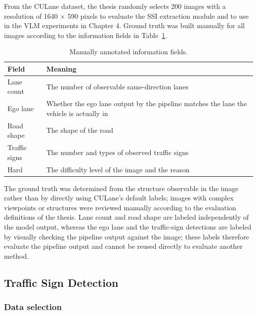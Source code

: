 \documentclass[12pt,a4paper]{report}
\begin{document}
From the CULane dataset, the thesis randomly selects 200 images with a resolution of 1640 $\times$ 590 pixels to evaluate the SSI extraction module and to use in the VLM experiments in Chapter 4. Ground truth was built manually for all images according to the information fields in Table~\ref{tab:3.3}.

\begin{table}[H]
    \centering
    \small
    \renewcommand{\arraystretch}{1.25}
    \caption{Manually annotated information fields.}
    \label{tab:3.3}
    \begin{tabularx}{\linewidth}{
        >{\RaggedRight\arraybackslash}p{3.0cm}
        >{\RaggedRight\arraybackslash}X
    }
        \toprule
        \textbf{Field} & \textbf{Meaning} \\
        \midrule
        Lane count & The number of observable same-direction lanes \\
        Ego lane & Whether the ego lane output by the pipeline matches the lane the vehicle is actually in \\
        Road shape & The shape of the road \\
        Traffic signs & The number and types of observed traffic signs \\
        Hard & The difficulty level of the image and the reason \\
        \bottomrule
    \end{tabularx}
\end{table}

The ground truth was determined from the structure observable in the image rather than by directly using CULane's default labels; images with complex viewpoints or structures were reviewed manually according to the evaluation definitions of the thesis. Lane count and road shape are labeled independently of the model output, whereas the ego lane and the traffic-sign detections are labeled by visually checking the pipeline output against the image; these labels therefore evaluate the pipeline output and cannot be reused directly to evaluate another method.

\subsection{Traffic Sign Detection}

\subsubsection*{Data selection}
\end{document}
